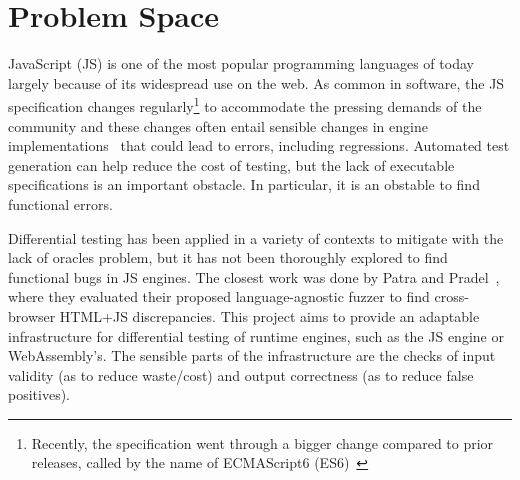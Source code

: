\documentclass[11pt]{article}
\newcommand{\eg}{e.g.}
\newcommand{\Comment}[1]{}
\begin{document}
\section{Problem Space}



JavaScript (JS) is one of the most popular programming languages of
today~\cite{business-insider,stackify} largely because of its
widespread use on the web. As common in software, the JS specification
changes regularly\footnote{Recently, the specification went through a
  bigger change compared to prior releases, called by the name of
  ECMAScript6 (ES6)~\cite{es6-features}} to accommodate the pressing
demands of the community and these changes often entail sensible
changes in engine implementations~\cite{kangax} that could lead to
errors, including regressions. Automated test generation can help reduce the
cost of testing, but the lack of executable specifications is an
important obstacle. In particular, it is an obstable to find functional errors.

\begin{center}
\end{center}

Differential testing\cite{McKeeman98differentialtesting} has been
applied in a variety of
contexts\cite{Brumley-etal-ss07,Yang-etal-pldi11,Chen-etal-fse2015,Argyros-etla-ccs16,Chen-etal-pldi16,petsios-etal-sp2017,SivakornAPKJ17}
to mitigate with the lack of oracles problem,
but it has not been thoroughly explored to find functional bugs in JS
engines. The closest work was done by Patra and
Pradel~\cite{patra2016learning}, where they evaluated their proposed
language-agnostic fuzzer to find cross-browser HTML+JS
discrepancies. This project aims to provide an adaptable
infrastructure for differential testing of runtime engines, such as
the JS engine or WebAssembly's. The sensible parts of the
infrastructure are the checks of input validity (as to reduce
waste/cost) and output correctness (as to reduce false positives).
\end{document}
